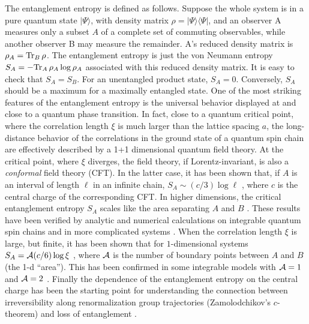 \documentclass[12pt,preprint,tighten,eqsecnum,aps,floats,psfig,epsfig,amsmath,onecolumn]{revtex4-1}
\begin{document}
The entanglement entropy is defined as follows.  
Suppose the whole system is in a pure quantum state $|\Psi\rangle$, 
with density matrix
$\rho=|\Psi\rangle\langle\Psi|$, and an observer A measures only a
subset $A$ of a complete set of commuting observables, while another
observer B may measure the remainder. A's reduced density matrix is
$\rho_A={\rm Tr}_B\,\rho$. The entanglement entropy is just the von
Neumann entropy $S_A=-{\rm Tr}_A\,\rho_A\log\rho_A$ associated with this
reduced density matrix. It is easy to check that $S_A=S_B$. For an
unentangled product state, $S_A=0$. Conversely, $S_A$ should be a
maximum for a maximally entangled state. 
One of the most striking features of the entanglement entropy is the 
universal behavior displayed at and close to a quantum phase transition.
In fact, close to a quantum critical point, where the correlation length 
$\xi$ is much larger than the lattice spacing $a$, 
the long-distance behavior of the correlations in the ground state of
a quantum spin chain are effectively described by a 1+1 dimensional 
quantum field theory.
At the critical point, where $\xi$ diverges, the field theory, if
Lorentz-invariant, is also  
a {\em conformal} field theory (CFT). 
In the latter case, it has been shown that, if $A$ is an interval of 
length $\ell$ in an infinite chain,  
$S_A\sim (c/3)\log\ell$ \cite{Holzhey,cc-04}, where $c$ is 
the central charge of the corresponding CFT.
In higher dimensions, the critical entanglement entropy $S_A$ scales like
the area separating $A$ and $B$ \cite{s-93,Vidal,cc-04}.
These results have been verified by analytic and numerical calculations on 
integrable quantum spin chains and in more complicated 
systems \cite{Vidal,jk-04,ijk-04,p-05,other,dur}. 
When the correlation length $\xi$ is large, but finite, it has been shown that
for $1$-dimensional systems $S_A= {\cal A}(c/6)\log\xi$ \cite{cc-04}, 
where ${\cal A}$ is the number of boundary points between $A$ and $B$
(the 1-d ``area''). This has been confirmed in some integrable models 
with ${\cal A}=1$ \cite{cc-04} and ${\cal A}=2$ \cite{ijk-04,p-05}.
Finally the dependence of the entanglement entropy on the central charge
has been the starting point for understanding the 
connection between irreversibility 
along renormalization group trajectories (Zamolodchikov's 
$c$-theorem\cite{Zam}) and loss of entanglement \cite{Vidal,loss}.
\end{document}
